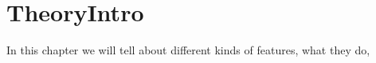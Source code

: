 \section{TheoryIntro}
In this chapter we will tell about different kinds of features, what they do,  